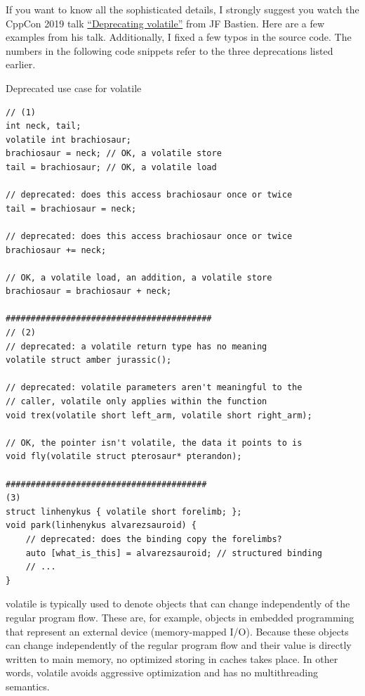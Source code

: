 If you want to know all the sophisticated details, I strongly suggest you watch the CppCon 2019 talk \href{https://www.youtube.com/watch?v=KJW_DLaVXIY}{“Deprecating volatile”} from JF Bastien. Here are a few examples from his talk. Additionally, I fixed a few typos in the source code. The numbers in the following code snippets refer to the three deprecations listed earlier.

\noindent
Deprecated use case for volatile
\begin{lstlisting}[style=styleCXX]
// (1)
int neck, tail;
volatile int brachiosaur;
brachiosaur = neck; // OK, a volatile store
tail = brachiosaur; // OK, a volatile load

// deprecated: does this access brachiosaur once or twice
tail = brachiosaur = neck;

// deprecated: does this access brachiosaur once or twice
brachiosaur += neck;

// OK, a volatile load, an addition, a volatile store
brachiosaur = brachiosaur + neck;

#########################################
// (2)
// deprecated: a volatile return type has no meaning
volatile struct amber jurassic();

// deprecated: volatile parameters aren't meaningful to the
// caller, volatile only applies within the function
void trex(volatile short left_arm, volatile short right_arm);

// OK, the pointer isn't volatile, the data it points to is
void fly(volatile struct pterosaur* pterandon);

########################################
(3)
struct linhenykus { volatile short forelimb; };
void park(linhenykus alvarezsauroid) {
	// deprecated: does the binding copy the forelimbs?
	auto [what_is_this] = alvarezsauroid; // structured binding
	// ...
}
\end{lstlisting}

\begin{tcolorbox}[colback=red!5!white,colframe=red!75!black,title={volatile and Multithreading Semantics}]
volatile is typically used to denote objects that can change independently of the regular program flow. These are, for example, objects in embedded programming that represent an external device (memory-mapped I/O). Because these objects can change independently of the regular program flow and their value is directly written to main memory, no optimized storing in caches takes place. In other words, volatile avoids aggressive optimization and has no multithreading semantics.
\end{tcolorbox}

